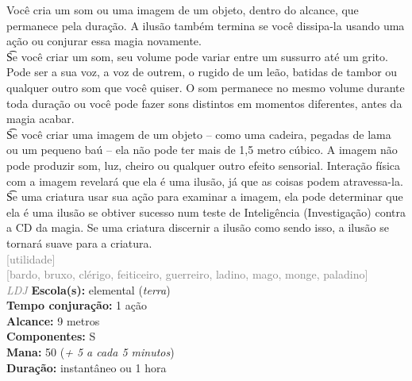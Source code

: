 \documentclass{RPG_Adventure}[2021/10/20]
\begin{document}
{\normalsize Você cria um som ou uma imagem de um objeto, dentro do alcance, que permanece pela duração. A ilusão também termina se você dissipa-la usando uma ação ou conjurar essa magia novamente.\\\t Se você criar um som, seu volume pode variar entre um sussurro até um grito. Pode ser a sua voz, a voz de outrem, o rugido de um leão, batidas de tambor ou qualquer outro som que você quiser. O som permanece no mesmo volume durante toda duração ou você pode fazer sons distintos em momentos diferentes, antes da magia acabar.\\\t Se você criar uma imagem de um objeto – como uma cadeira, pegadas de lama ou um pequeno baú – ela não pode ter mais de 1,5 metro cúbico. A imagem não pode produzir som, luz, cheiro ou qualquer outro efeito sensorial. Interação física com a imagem revelará que ela é uma ilusão, já que as coisas podem atravessa-la.\\\t Se uma criatura usar sua ação para examinar a imagem, ela pode determinar que ela é uma ilusão se obtiver sucesso num teste de Inteligência (Investigação) contra a CD da magia. Se uma criatura discernir a ilusão como sendo isso, a ilusão se tornará suave para a criatura.\\}
{\scriptsize \textcolor{gray}{[utilidade]\\}}
{\scriptsize \textcolor{gray}{[bardo, bruxo, clérigo, feiticeiro, guerreiro, ladino, mago, monge, paladino]\\}}
{\tiny \textcolor{gray}{\textit{LDJ}}}
{\small \t \textbf{Escola(s):} elemental (\textit{terra})\\\t \textbf{Tempo conjuração:} 1 ação\\\t \textbf{Alcance:} 9 metros\\\t \textbf{Componentes:} S\\\t \textbf{Mana:} 50 (\textit{+ 5 a cada 5 minutos})\\\t \textbf{Duração:} instantâneo ou 1 hora\\}
\end{document}
